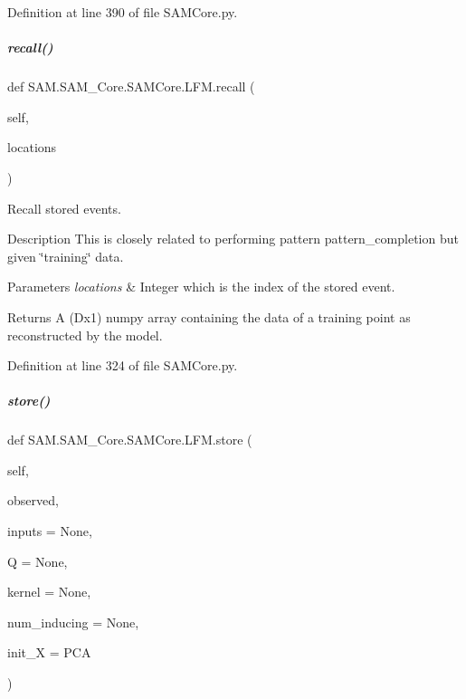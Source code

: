 Definition at line 390 of file S\+A\+M\+Core.\+py.

\mbox{\label{group__icubclient__SAM__Core_a2062b06580e32b119f134994ecc756d9}} 
\subparagraph{\texorpdfstring{recall()}{recall()}}
{\footnotesize\ttfamily def S\+A\+M.\+S\+A\+M\+\_\+\+Core.\+S\+A\+M\+Core.\+L\+F\+M.\+recall (\begin{DoxyParamCaption}\item[{}]{self,  }\item[{}]{locations }\end{DoxyParamCaption})}



Recall stored events. 

\begin{DoxyParagraph}{Description}
This is closely related to performing pattern pattern\+\_\+completion but given \char`\"{}training\char`\"{} data.
\end{DoxyParagraph}

\begin{DoxyParams}{Parameters}
{\em locations} & Integer which is the index of the stored event.\\
\hline
\end{DoxyParams}
\begin{DoxyReturn}{Returns}
A {\ttfamily (Dx1)} numpy array containing the data of a training point as reconstructed by the model. 
\end{DoxyReturn}


Definition at line 324 of file S\+A\+M\+Core.\+py.

\mbox{\label{group__icubclient__SAM__Core_aa7ce30e03fc75b4d5b5a49a6ee8c288f}} 
\subparagraph{\texorpdfstring{store()}{store()}}
{\footnotesize\ttfamily def S\+A\+M.\+S\+A\+M\+\_\+\+Core.\+S\+A\+M\+Core.\+L\+F\+M.\+store (\begin{DoxyParamCaption}\item[{}]{self,  }\item[{}]{observed,  }\item[{}]{inputs = {\ttfamily None},  }\item[{}]{Q = {\ttfamily None},  }\item[{}]{kernel = {\ttfamily None},  }\item[{}]{num\+\_\+inducing = {\ttfamily None},  }\item[{}]{init\+\_\+X = {\ttfamily \textquotesingle{}PCA\textquotesingle{}} }\end{DoxyParamCaption})}



